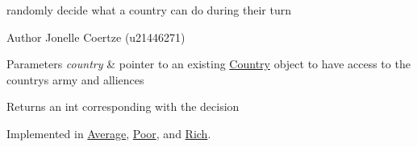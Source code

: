 randomly decide what a country can do during their turn 

\begin{DoxyAuthor}{Author}
Jonelle Coertze (u21446271) 
\end{DoxyAuthor}

\begin{DoxyParams}{Parameters}
{\em country} & pointer to an existing \mbox{\hyperlink{class_country}{Country}} object to have access to the country\textquotesingle{}s army and alliences \\
\hline
\end{DoxyParams}
\begin{DoxyReturn}{Returns}
an int corresponding with the decision 
\end{DoxyReturn}


Implemented in \mbox{\hyperlink{class_average_a9f12fe85255eea770296e0f30fe80a61}{Average}}, \mbox{\hyperlink{class_poor_a6dbe987b4d90c0e54b5e588d6f0e2ac7}{Poor}}, and \mbox{\hyperlink{class_rich_ad954bcdfda731cf61098094a6a889a5f}{Rich}}.


